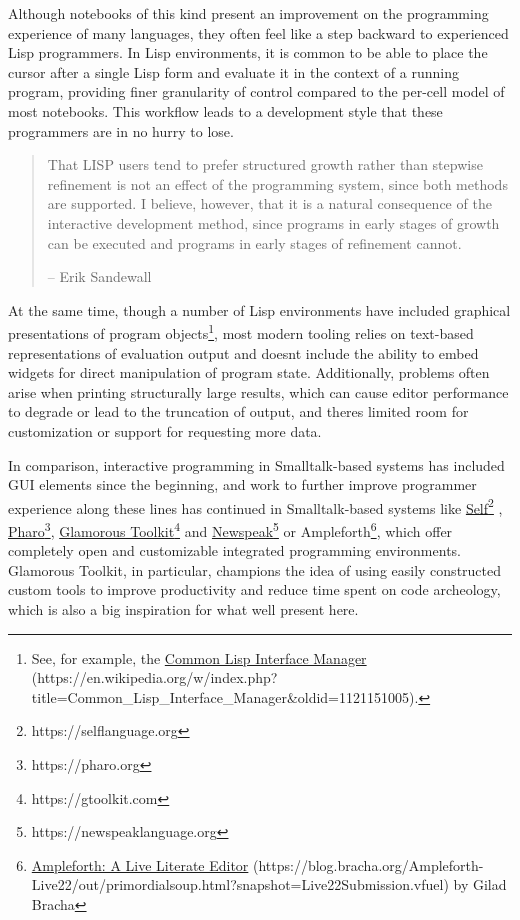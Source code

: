 \documentclass[sigconf,screen,pbalance=true]{acmart}
\begin{document}
Although notebooks of this kind present an improvement on the programming experience of many languages, they often feel like a step backward to experienced Lisp programmers. In Lisp environments, it is common to be able to place the cursor after a single Lisp form and evaluate it in the context of a running program, providing finer granularity of control compared to the per-cell model of most notebooks. This workflow leads to a development style that these programmers are in no hurry to lose.

\begin{quote}
That LISP users tend to prefer structured growth rather than stepwise refinement is not an effect of the programming system, since both methods are supported. I believe, however, that it is a natural consequence of the interactive development method, since programs in early stages of growth can be executed and programs in early stages of refinement cannot. \cite{Sandewall_1978}

-- Erik Sandewall
\end{quote}

At the same time, though a number of Lisp environments have included graphical presentations of program objects\footnote{See, for example, the {\href{https://en.wikipedia.org/w/index.php?title=Common_Lisp_Interface_Manager\&oldid=1121151005}{Common Lisp Interface Manager} (https://en.wikipedia.org/w/index.php\newline?title=Common\_Lisp\_Interface\_Manager\&oldid=1121151005)}.}, most modern tooling relies on text-based representations of evaluation output and doesn\textquotesingle t include the ability to embed widgets for direct manipulation of program state. Additionally, problems often arise when printing structurally large results, which can cause editor performance to degrade or lead to the truncation of output, and there\textquotesingle s limited room for customization or support for requesting more data.

In comparison, interactive programming in Smalltalk-based systems has included GUI elements since the beginning, and work to further improve programmer experience along these lines has continued in Smalltalk-based systems like {\href{https://selflanguage.org}{Self}\footnote{https://selflanguage.org}} \cite{Ungar_1987}, {\href{https://pharo.org}{Pharo}\footnote{https://pharo.org}}, {\href{https://gtoolkit.com}{Glamorous Toolkit}\footnote{https://gtoolkit.com}} \cite{Chi__2015} and {\href{https://newspeaklanguage.org}{Newspeak}\footnote{https://newspeaklanguage.org}} or Ampleforth\footnote{{\href{https://blog.bracha.org/Ampleforth-Live22/out/primordialsoup.html?snapshot=Live22Submission.vfuel}{Ampleforth: A Live Literate Editor} (https://blog.bracha.org/Ampleforth-Live22/out/primordialsoup.html?snapshot=Live22Submission.vfuel)} by Gilad Bracha}, which offer completely open and customizable integrated programming environments. Glamorous Toolkit, in particular, champions the idea of using easily constructed custom tools to improve productivity and reduce time spent on code archeology, which is also a big inspiration for what we\textquotesingle ll present here.
\end{document}
